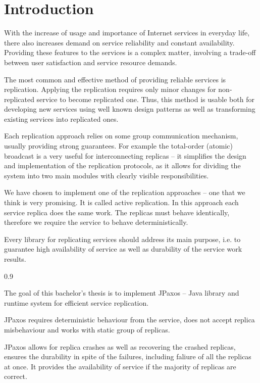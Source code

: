 
\chapter{Introduction}

With the increase of usage and importance of Internet services in everyday life, there also increases demand on service reliability and constant availability.
Providing these features to the services is a complex matter, involving a trade-off between user satisfaction and service resource demands.

The most common and effective method of providing reliable services is replication. Applying the replication requires only minor changes for non-replicated service to become replicated one. Thus, this method is usable both for developing new services using well known design patterns as well as transforming existing services into replicated ones.

Each replication approach relies on some group communication mechanism, usually providing strong guarantees. For example the total-order (atomic) broadcast is a very useful for interconnecting replicas -- it simplifies the design and implementation of the replication protocols, as it allows for dividing the system into two main modules with clearly visible responsibilities.

We have chosen to implement one of the replication approaches -- one that we think is very promising.
It is called active replication. In this approach each service replica does the same work. The replicas must behave identically, therefore we require the service to behave deterministically.

Every library for replicating services should address its main purpose, i.e. to guarantee high availability of service as well as durability of the service work results.


\begin{minipageWithIndent}{0.9\textwidth}
{
\bfseries

The goal of this bachelor's thesis is to implement JPaxos -- Java library and runtime system for efficient service replication.

JPaxos requires deterministic behaviour from the service, does not accept replica misbehaviour and works with static group of replicas.

JPaxos allows for replica crashes as well as recovering the crashed replicas, ensures the durability in spite of the failures, including faliure of all the replicas at once. It provides the availability of service if the majority of replicas are correct.
}
\end{minipageWithIndent}

